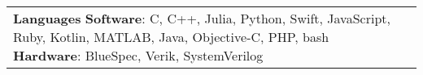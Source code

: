 \documentclass{resume}
\begin{document}
\begin{minipage}[t][0pt]{\linewidth}
\begin{center}
\begin{tabularx}{\linewidth}{ p{6cm} X  }
{{            \vspace{\skillSpacing}
        
            \textbf{Languages} \newline
            {\footnotesize \textbf{Software}: C, C++, Julia, Python, Swift, JavaScript, Ruby, Kotlin, MATLAB, Java, Objective-C, PHP, bash\newline
            \textbf{Hardware}: BlueSpec, Verik, SystemVerilog
            }{}{}
            
            
    }

    \vspace{-200px}
    
} 
& 
{

    \def \rightColVertSpacing {2px}

}
\end{tabularx}
\end{center}
\end{minipage}
\end{document}
